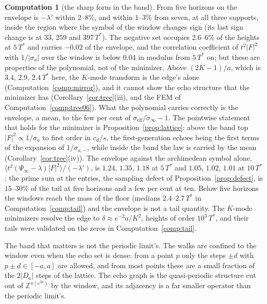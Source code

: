 \documentclass[11pt]{article}
\theoremstyle{definition}
\newtheorem{computation}[theorem]{Computation}
\theoremstyle{remark}
\newcommand{\Tst}{T^{*}}
\begin{document}
\begin{computation}[the sharp form in the band]
From five horizons on the envelope is $-\lambda'$ within $2$--$8\%$, and within $1$--$3\%$ from seven, at all three supports, inside the region where the symbol of the window changes sign (its last sign change is at $33$, $259$ and $397\,\Tst$). The negative set occupies $2.6$--$6\%$ of the heights at $5\,\Tst$ and carries $-0.02$ of the envelope, and the correlation coefficient of $t^2|F|^2$ with $1/|\sigma_a|$ over the window is below $0.04$ in modulus from $5\,\Tst$ on; but these are properties of the polynomial, not of the minimizer. Above $(2K-1)/a$, which is $3.4$, $2.9$, $2.4\,\Tst$ here, the $K$-mode transform is the edge's alone (Computation~\ref{comp:mirror}), and it cannot show the echo structure that the minimizer has (Corollary~\ref{cor:tree}(iii), and the FEM of Computation~\ref{comp:tree06}). What the polynomial carries correctly is the envelope, a mean, to the few per cent of $\sigma_{\mathrm{eff}}/\tilde\sigma_\infty-1$. The pointwise statement that holds for the minimizer is Proposition~\ref{prop:lattice}: above the band top $|F|^2\propto1/\sigma_a$ to first order in $c_d/s$, the first-generation echoes being the first terms of the expansion of $1/\sigma_{a,-}$, while inside the band the law is carried by the mean (Corollary~\ref{cor:tree}(iv)). The envelope against the archimedean symbol alone, $\langle t^2(\Psi_\infty-\lambda)|F|^2\rangle/(-\lambda')$, is $1.24$, $1.35$, $1.18$ at $5\,\Tst$ and $1.05$, $1.02$, $1.01$ at $10\,\Tst$: the prime sum at the entries, the sampling defect of Proposition~\ref{prop:defect}, is $15$--$30\%$ of the tail at five horizons and a few per cent at ten. Below five horizons the windows reach the mass of the floor (medians $2.4$--$2.7\,\Tst$ in Computation~\ref{comp:tail}) and the envelope is not a tail quantity. The $K$-mode minimizers resolve the edge to $\delta\approx e^{-2}a/K^2$, heights of order $10^3\,\Tst$, and their tails were validated on the zeros in Computation~\ref{comp:tail}.
\end{computation}

The band that matters is not the periodic limit's. The walks are confined to the window even when the echo set is dense: from a point $p$ only the steps $\pm d$ with $p\pm d\in[-a,a]$ are allowed, and from most points these are a small fraction of the $2|D_a|$ steps of the lattice. The echo graph is the quasi-periodic structure cut out of $\mathbb Z^{\pi(e^{2a})}$ by the window, and its adjacency is a far smaller operator than the periodic limit's.
\end{document}
